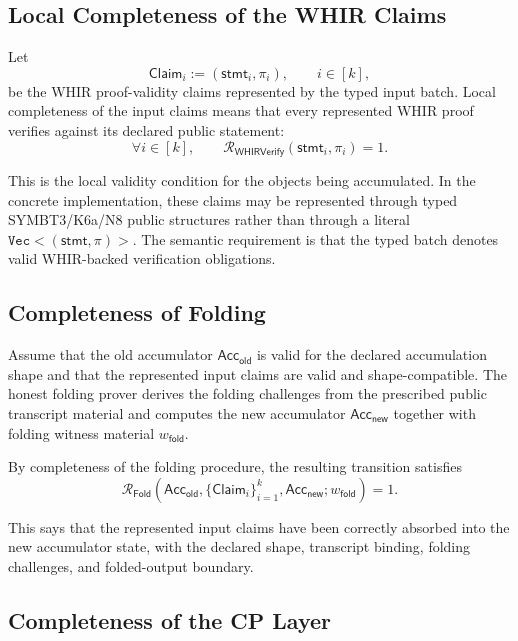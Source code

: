 \documentclass[11pt]{article}
\theoremstyle{definition}
\newcommand{\Acc}{\mathsf{Acc}}
\newcommand{\Rwhir}{\mathcal{R}_{\mathsf{WHIRVerify}}}
\newcommand{\Rfold}{\mathcal{R}_{\mathsf{Fold}}}
\begin{document}
\subsection{Local Completeness of the WHIR Claims}
\label{sec:local-completeness-of-whir-claims}

Let
\[
  \mathsf{Claim}_i := (\mathsf{stmt}_i,\pi_i),
  \qquad i\in[k],
\]
be the WHIR proof-validity claims represented by the typed input batch. Local
completeness of the input claims means that every represented WHIR proof
verifies against its declared public statement:
\[
  \forall i\in[k],\qquad
  \Rwhir(\mathsf{stmt}_i,\pi_i)=1.
\]

This is the local validity condition for the objects being accumulated. In the
concrete implementation, these claims may be represented through typed
SYMBT3/K6a/N8 public structures rather than through a literal
$\texttt{Vec}<(\mathsf{stmt},\pi)>$. The semantic requirement is that the typed
batch denotes valid WHIR-backed verification obligations.

\subsection{Completeness of Folding}
\label{sec:completeness-of-folding}

Assume that the old accumulator $\Acc_{\mathsf{old}}$ is valid for the declared
accumulation shape and that the represented input claims are valid and
shape-compatible. The honest folding prover derives the folding challenges from
the prescribed public transcript material and computes the new accumulator
$\Acc_{\mathsf{new}}$ together with folding witness material
$w_{\mathsf{fold}}$.

By completeness of the folding procedure, the resulting transition satisfies
\[
  \Rfold\!\left(
    \Acc_{\mathsf{old}},
    \{\mathsf{Claim}_i\}_{i=1}^k,
    \Acc_{\mathsf{new}};
    w_{\mathsf{fold}}
  \right)=1.
\]

This says that the represented input claims have been correctly absorbed into
the new accumulator state, with the declared shape, transcript binding,
folding challenges, and folded-output boundary.

\subsection{Completeness of the CP Layer}
\label{sec:completeness-of-cp-layer}
\end{document}
